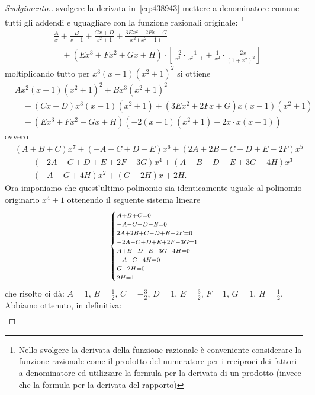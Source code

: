 \begin{proof}[Svolgimento.]
svolgere la derivata in~\eqref{eq:438943} mettere a denominatore
comune tutti gli addendi e uguagliare con la funzione razionali originale:
\footnote{%
Nello svolgere la derivata della funzione razionale è conveniente
considerare la funzione razionale come il prodotto del numeratore
per i reciproci dei fattori a denominatore ed utilizzare la formula
per la derivata di un prodotto (invece che la formula per la derivata del rapporto)%
}
\begin{align*}
  &\frac{A}{x} + \frac{B}{x-1} + \frac{Cx+D}{x^2+1}
  + \frac{3 E x^2 + 2 F x + G}{x^2(x^2+1)} \\
  & \quad + (E x^3 + F x^2 + G x + H)\cdot \left[\frac{-2}{x^3}\cdot \frac{1}{x^2+1}
  + \frac{1}{x^2}\cdot\frac{-2x}{(1+x^2)^2}\right]
\end{align*}
moltiplicando tutto per $x^3(x-1)(x^2+1)^2$ si ottiene
\begin{align*}
  &Ax^2(x-1)(x^2+1)^2 + Bx^3(x^2+1)^2 \\
  &\quad + (Cx+D)x^3(x-1)(x^2+1) + (3Ex^2+2Fx+G)x(x-1)(x^2+1)\\
  &\quad + (Ex^3+Fx^2+Gx+H)(-2(x-1)(x^2+1)-2x\cdot x(x-1))
\end{align*}
ovvero
\begin{align*}
  &(A+B+C)x^7+(-A-C+D-E)x^6 + (2A+2B+C-D+E-2F)x^5 \\
  &\quad  +(-2A-C+D+E+2F-3G)x^4 + (A+B-D-E+3G-4H)x^3 \\
  &\quad  + (-A-G+4H)x^2 + (G-2H) x + 2H.
\end{align*}
Ora imponiamo che quest'ultimo polinomio sia identicamente uguale
al polinomio originario $x^4+1$ ottenendo il seguente sistema lineare
\[
  \begin{dcases}
    \scriptstyle
    A+B+C=0 \\[-1ex]
    \scriptstyle
    -A-C+D-E=0 \\[-1ex]
    \scriptstyle
    2A + 2B + C - D + E - 2 F = 0\\[-1ex]
    \scriptstyle
    -2A-C+D+E+2F-3G = 1\\[-1ex]
    \scriptstyle
    A+B-D-E+3G-4H=0\\[-1ex]
    \scriptstyle
    -A-G+4H=0\\[-1ex]
    \scriptstyle
    G-2H=0\\[-1ex]
    \scriptstyle
    2H=1
  \end{dcases}
\]
che risolto ci dà: $A=1$, $B=\frac 1 2$, $C = -\frac 3 2$, $D=1$, $E=\frac 3 2$, $F=1$, $G=1$, $H=\frac 1 2$.
Abbiamo ottenuto, in definitiva:
\begin{align*}

\end{align*}
\end{proof}
